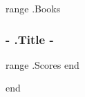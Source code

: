 \documentclass[a4paper]{article}
\begin{document}
{{range .Books}}
\subsubsection*{ {{- .Title -}} }

{{range .Scores}}
{{end}}

{{end}}
\end{document}
